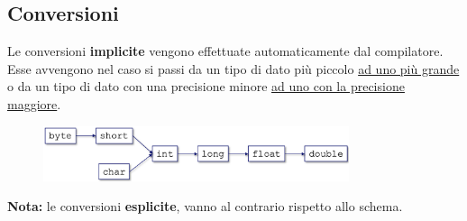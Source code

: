 \documentclass[../main.tex]{subfiles}
\begin{document}
\subsection{Conversioni}
Le conversioni \textbf{implicite} vengono effettuate automaticamente dal compilatore. Esse avvengono nel caso si passi da un tipo di dato
più piccolo \underline{ad uno più grande} o da un tipo di dato con una precisione minore \underline{ad uno con la precisione maggiore}.
\begin{figure}[h]
    \centering
    \includegraphics[width=0.8\textwidth]{../images/conversioni.png}
\end{figure}

\textbf{Nota:} le conversioni \textbf{esplicite}, vanno al contrario rispetto allo schema.
\end{document}

